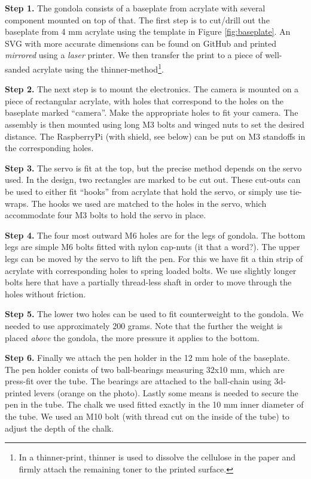 \documentclass[a4paper,10pt]{article}
\begin{document}
\textbf{Step 1.} The gondola consists of a baseplate from acrylate with several component mounted on top of that. The first step is to cut/drill out the baseplate from 4 mm acrylate using the template in Figure \ref{fig:baseplate}. An SVG with more accurate dimensions can be found on GitHub\cite{github} and printed \emph{mirrored} using a \emph{laser} printer. We then transfer the print to a piece of well-sanded acrylate using the thinner-method\footnote{In a thinner-print, thinner is used to dissolve the cellulose in the paper and firmly attach the remaining toner to the printed surface.}.

\textbf{Step 2.} The next step is to mount the electronics. The camera is mounted on a piece of rectangular acrylate, with holes that correspond to the holes on the baseplate marked ``camera''. Make the appropriate holes to fit your camera. The assembly is then mounted using long M3 bolts and winged nuts to set the desired distance. The RaspberryPi (with shield, see below) can be put on M3 standoffs in the corresponding holes.

\textbf{Step 3.} The servo is fit at the top, but the precise method depends on the servo used. In the design, two rectangles are marked to be cut out. These cut-outs can be used to either fit ``hooks'' from acrylate that hold the servo, or simply use tie-wraps. The hooks we used are matched to the holes in the servo, which accommodate four M3 bolts to hold the servo in place.

\textbf{Step 4.} The four most outward M6 holes are for the legs of gondola. The bottom legs are simple M6 bolts fitted with nylon cap-nuts (it that a word?). The upper legs can be moved by the servo to lift the pen. For this we have fit a thin strip of acrylate with corresponding holes to spring loaded bolts. We use slightly longer bolts here that have a partially thread-less shaft in order to move through the holes without friction.

\textbf{Step 5.} The lower two holes can be used to fit counterweight to the gondola. We needed to use approximately 200 grams. Note that the further the weight is placed \emph{above} the gondola, the more pressure it applies to the bottom.

\textbf{Step 6.} Finally we attach the pen holder in the 12 mm hole of the baseplate. The pen holder conists of two ball-bearings measuring 32x10 mm, which are press-fit over the tube. The bearings are attached to the ball-chain using 3d-printed levers (orange on the photo). Lastly some means is needed to secure the pen in the tube. The chalk we used fitted exactly in the 10 mm inner diameter of the tube. We used an M10 bolt (with thread cut on the inside of the tube) to adjust the depth of the chalk.
\end{document}
